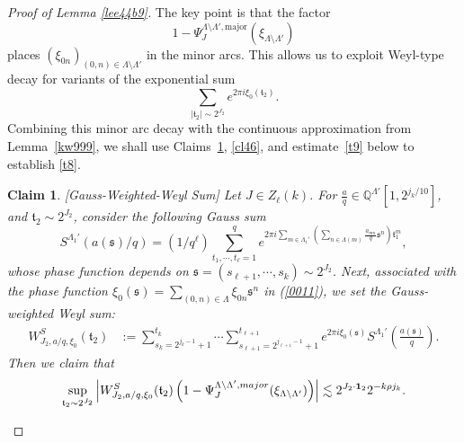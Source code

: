 \documentclass[10pt,a4paper]{amsart}
\newtheorem{claim}{Claim}\numberwithin{claim}{section}
\numberwithin{equation}{section}
\begin{document}
\begin{proof}[Proof of Lemma \ref{lee44b9}]
The key point is that the factor
\[
1-\Psi_J^{\Lambda\setminus \Lambda',\mathrm{major}}(\xi_{\Lambda\setminus\Lambda'})
\]
places $(\xi_{0n})_{(0,n)\in \Lambda\setminus\Lambda'}$ in the minor arcs. This allows us to exploit Weyl-type decay for variants of the exponential sum
\[
\sum_{|\mathfrak{t}_2|\sim 2^{J_2}} e^{2\pi i \xi_0(\mathfrak{t}_2)}.
\]
Combining this minor arc decay with the continuous approximation from Lemma~\ref{kw999}, we shall use Claims~\ref{ap90}, \ref{cl46}, and estimate~\eqref{t9} below to establish \eqref{t8}.

\begin{claim}\label{ap90} [Gauss-Weighted-Weyl Sum] 
Let  $J\in Z_{\ell}(k)$. For    $\frac{a}{q} \in  \mathbb{Q}^{\Lambda'}[1,2^{j_k/10}]$, and $\mathfrak{t}_2\sim 2^{J_2}$,  consider the following Gauss sum
$$ S^{\Lambda_1'}(a(\mathfrak{s})/q)=(1/q^{\ell})\sum_{t_1,\cdots,t_{\ell}=1}^q e^{2\pi i \sum_{m\in \Lambda_1'}\left(\sum_{n\in \Lambda(m)} \frac{a_{mn}}{q}\mathfrak{s}^n\right)\mathfrak{t}_1^{m}},$$  whose phase function depends on $\mathfrak{s}=(s_{\ell+1},\cdots,s_k)\sim 2^{J_2}$. Next, associated with the phase function  $ \xi_0(\mathfrak{s})=\sum_{(0,n)\in \Lambda} \xi_{0n}\mathfrak{s}^{n} $  in (\ref{0011}), we set the Gauss-weighted Weyl sum:
\begin{align}\label{kanj}
 W^S_{J_2,a/q,\xi_0}(\mathfrak{t}_2)& :=\sum_{s_k=2^{j_k-1}+1}^{t_k} \cdots \sum_{s_{\ell+1}=2^{j_{\ell+1}-1}+1}^{t_{\ell+1}} e^{2\pi i \xi_0(\mathfrak{s})}S^{\Lambda_{1}'}\left(\frac{a(\mathfrak{s})}{q}\right).
\end{align}
  Then we  claim that 
\begin{align}\label{sstt19}
\sup_{ \mathfrak{t}_2 \sim 2^{J_2}}\left| W^S_{J_2,a/q,\xi_0}(\mathfrak{t}_2)\left(1-\Psi_J^{\Lambda\setminus \Lambda',\rm{major}}(\xi_{\Lambda\setminus\Lambda'})\right)\right|\lesssim 2^{J_2\cdot {\bf 1}_2}2^{-k\rho j_{k}}.
\end{align}
\end{claim}


\end{proof}
\end{document}
